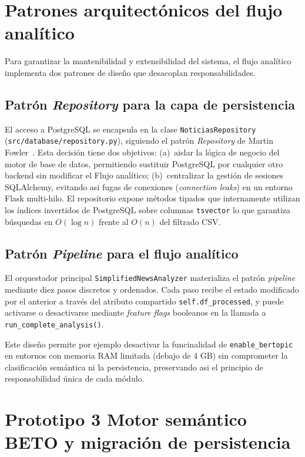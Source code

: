 \section{Patrones arquitectónicos del flujo analítico}
\label{sec:tt2_patrones}

Para garantizar la mantenibilidad y extensibilidad del sistema, el flujo analítico
implementa dos patrones de diseño que desacoplan responsabilidades.

\subsection{Patrón \textit{Repository} para la capa de persistencia}
\label{subsec:tt2_repository}

El acceso a PostgreSQL se encapsula en la clase \texttt{NoticiasRepository}
(\texttt{src/database/repository.py}), siguiendo el patrón \textit{Repository}
de Martin Fowler~\cite{fowler2002}. Esta decisión tiene dos objetivos:
(a)~aislar la lógica de negocio del motor de base de datos, permitiendo
sustituir PostgreSQL por cualquier otro backend sin modificar el Flujo analítico;
(b)~centralizar la gestión de sesiones SQLAlchemy, evitando asi fugas de conexiones
(\textit{connection leaks}) en un entorno Flask multi-hilo.
El repositorio expone métodos tipados que internamente utilizan los índices invertidos
de PostgreSQL sobre columnas \texttt{tsvector} lo que garantiza búsquedas en
$O(\log n)$ frente al $O(n)$ del filtrado CSV.

\subsection{Patrón \textit{Pipeline} para el flujo analítico}
\label{subsec:tt2_pipeline}

El orquestador principal \texttt{SimplifiedNewsAnalyzer} materializa el patrón
\textit{pipeline} mediante diez pasos discretos y ordenados. Cada paso recibe el
estado modificado por el anterior a través del atributo compartido \texttt{self.df\_processed}, y puede
activarse o desactivarse mediante \textit{feature flags} booleanos en la llamada
a \texttt{run\_complete\_analysis()}.

Este diseño permite por ejemplo desactivar la funcinalidad de \texttt{enable\_bertopic} en entornos
con memoria RAM limitada (debajo de 4 GB) sin comprometer la clasificación semántica
ni la persistencia, preservando asi el principio de responsabilidad única de cada módulo.


\section{Prototipo 3 Motor semántico BETO y migración de persistencia}
\label{sec:tt2_prototipo3}


